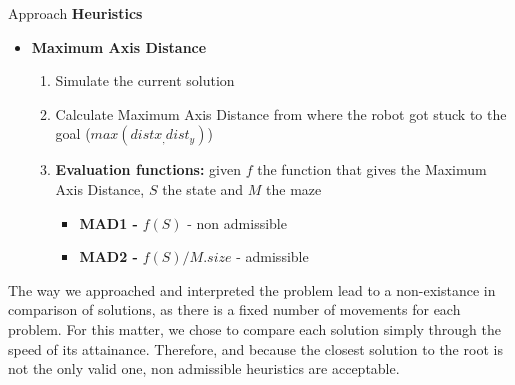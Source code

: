 \begin{frame}{Approach}
    \textbf{Heuristics}
    \begin{itemize}
        \item \textbf{Maximum Axis Distance}
        \begin{enumerate}
            \item Simulate the current solution
            \item Calculate Maximum Axis Distance from where the robot got stuck to the goal ($max(distx_, dist_y)$)
            \item \textbf{Evaluation functions:} given $f$ the function that gives the Maximum Axis Distance, $S$ the state and $M$ the maze
            \begin{itemize}
                \item \textbf{MAD1 - } $f(S)$ - non admissible
                \item \textbf{MAD2 - } $f(S) / M.size$ - admissible
            \end{itemize}
        \end{enumerate}
    \end{itemize}
    
    The way we approached and interpreted the problem lead to a non-existance in comparison of solutions, as there is a fixed number of movements for each problem. For this matter, we chose to compare each solution simply through the speed of its attainance. Therefore, and because the closest solution to the root is not the only valid one, non admissible heuristics are acceptable. 
    
\end{frame}

